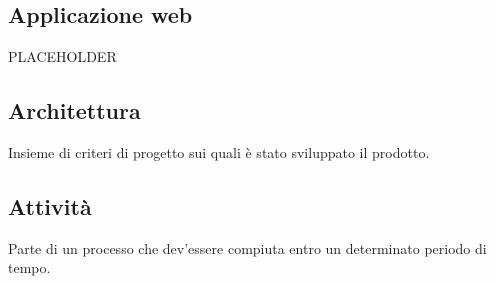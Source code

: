 \documentclass[../glossario.tex]{subfiles}
\begin{document}
\subsection*{Applicazione web}
PLACEHOLDER

\subsection*{Architettura}
Insieme di criteri di progetto sui quali è stato sviluppato il prodotto.

\subsection*{Attività}
Parte di un processo che dev'essere compiuta entro un determinato periodo di tempo.
\end{document}
